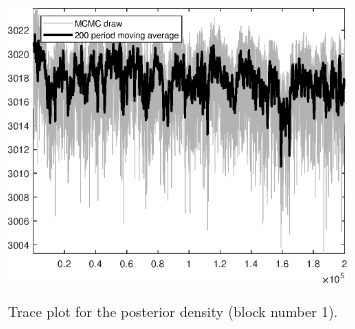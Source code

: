 \begin{figure}[H]
\centering
  \includegraphics[width=0.8\textwidth]{RBC_growth/graphs/TracePlot_Posterior_blck_1}\\
    \caption{Trace plot for the posterior density (block number 1).}
\end{figure}
